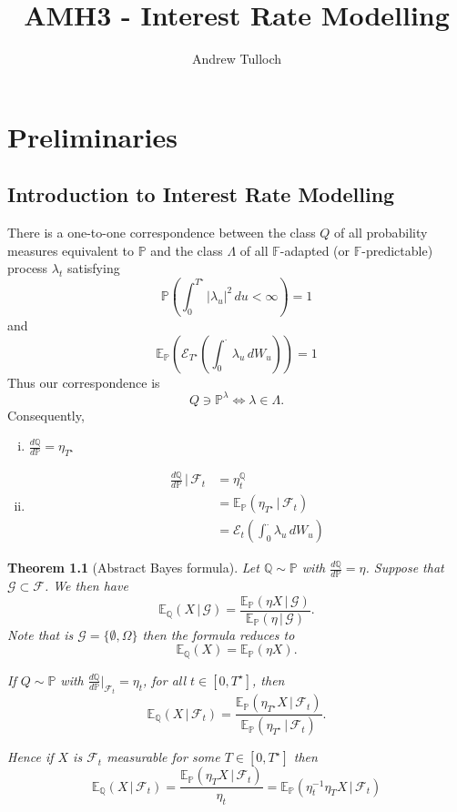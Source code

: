 \documentclass[10pt, oneside, reqno]{amsbook}
\title{AMH3 - Interest Rate Modelling}                              %
\author{Andrew Tulloch}
\theoremstyle{plain}%
\newtheorem{thm}{Theorem}[chapter]
\theoremstyle{definition}
\theoremstyle{remark}
\newcommand{\given}{ \, | \,}
\newcommand{\sigf}{\mathcal{F}}
\newcommand{\Q}{\mathbb{Q}}
\newcommand{\E}{\mathbb{E}}
\renewcommand{\P}{\mathbb{P}}
\newcommand{\F}{\mathbb{F}}
\newcommand{\sigg}{\mathcal{G}}
\newcommand{\doleans}[1]{\mathcal E_t \left(\int_0^\cdot #1 \right)}
\numberwithin{equation}{chapter}
\begin{document}
\maketitle \tableofcontents \clearpage


\tableofcontents

\chapter{Preliminaries} %
\label{cha:preliminaries}

\section{Introduction to Interest Rate Modelling} %
\label{sec:introduction_to_interest_rate_modelling}

There is a one-to-one correspondence between the class $Q$ of all probability measures equivalent to $\P$ and the class $\Lambda$ of all $\F$-adapted (or $\F$-predictable) process $\lambda_t$ satisfying \[
    \P\left(\int_0^{T^\star} |\lambda_u|^2 \, du < \infty \right) = 1
\]
and \[
    \E_\P\left( \mathcal{E}_{T^\star} \left(\int_0^\cdot \lambda_u \, dW_u\right) \right) = 1
\] 
Thus our correspondence is \[Q \ni \P^\lambda \iff \lambda \in \Lambda.\]
Consequently, \begin{enumerate}[(i)]
    \item $\frac{d\Q}{d\P} = \eta_{T^\star}$
    \item \begin{align*}
        \frac{d\Q}{d\P} \given \sigf_t  &= \eta^\Q_t \\
                                        &= \E_\P\left(\eta_{T^\star} \given \sigf_t \right) \\
                                        &= \doleans{\lambda_u \, dW_u}
    \end{align*}
\end{enumerate}

\begin{thm}[Abstract Bayes formula]
    Let $\Q \sim \P$ with $\frac{d \Q}{d \P} = \eta$.  Suppose that $\sigg \subset \sigf$.  We then have \[
        \E_\Q(X \given \sigg) = \frac{\E_\P(\eta X \given \sigg)}{\E_\P(\eta \given \sigg)}.
    \]  Note that is $\sigg = \{ \emptyset, \Omega \}$ then the formula reduces to \[
        \E_\Q(X) = \E_\P(\eta X).
    \]

    If $Q \sim \P$ with $\frac{d\Q}{d\P} |_{\sigf_t} = \eta_t$, for all $t \in [0, T^\star]$, then \[
        \E_\Q(X \given \sigf_t) = \frac{\E_\P(\eta_{T^\star} X \given \sigf_t)}{\E_\P(\eta_{T^\star} \given \sigf_t)}.
    \]
    
    Hence if $X$ is $\sigf_t$ measurable for some $T \in [0, T^\star]$ then \[
        \E_\Q(X \given \sigf_t) = \frac{\E_\P(\eta_T X \given \sigf_t)}{\eta_t} = \E_\P(\eta_t^{-1} \eta_T X \given \sigf_t)
    \]
\end{thm}
\end{document}
